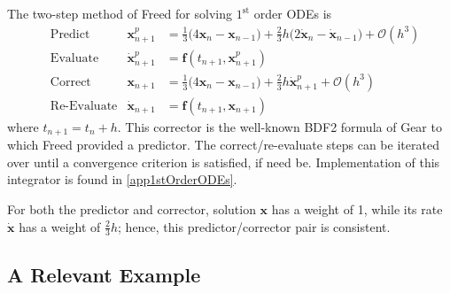 The two-step method of Freed \cite{Freed17a} for solving $1^{\text{st}}$ order ODEs is
\begin{subequations}
    \label{1stOrderODEs}
    \begin{align}
    \mbox{} & \text{Predict} & 
    \mathbf{x}_{n+1}^p & = \tfrac{1}{3} 
    \bigl( 4 \mathbf{x}_n - \mathbf{x}_{n-1} \bigr) + 
    \tfrac{2}{3} h \bigl( 2 \dot{\mathbf{x}}_n - \dot{\mathbf{x}}_{n-1} 
    \bigr) + \mathcal{O} (h^3)
    \label{1stOrderPredictor} \\
    \mbox{} & \text{Evaluate} & 
    \dot{\mathbf{x}}^p_{n+1} & = \mathbf{f} (t_{n+1} , \mathbf{x}_{n+1}^p) 
    \label{1stOrderEvaluate} \\
    \mbox{} & \text{Correct} &
    \mathbf{x}_{n+1} & = \tfrac{1}{3} 
    \bigl( 4 \mathbf{x}_n - \mathbf{x}_{n-1} \bigr) + 
    \tfrac{2}{3} h \dot{\mathbf{x}}^{p}_{n+1} + \mathcal{O} (h^3)
    \label{1stOrderCorrector} \\
    \mbox{} & \text{Re-Evaluate} & 
    \dot{\mathbf{x}}_{n+1} & = \mathbf{f} (t_{n+1} , \mathbf{x}_{n+1}) 
    \label{1stOrderReEvaluate}
    \end{align}
\end{subequations} 
where $t_{n+1} = t_n + h$.  This corrector is the well-known BDF2 formula of Gear to which Freed provided a predictor.  The correct\slash re-evaluate steps can be iterated over until a convergence criterion is satisfied, if need be.  Implementation of this integrator is found in \ref{app1stOrderODEs}.  

For both the predictor and corrector, solution $\mathbf{x}$ has a weight of 1, while its rate $\dot{\mathbf{x}}$ has a weight of $\tfrac{2}{3} h$; hence, this predictor\slash corrector pair is consistent.

\subsection{A Relevant Example}

